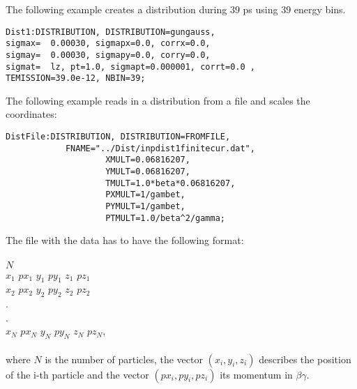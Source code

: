 The following example creates a distribution during $39$ ps using $39$ energy bins.
\begin{verbatim}
Dist1:DISTRIBUTION, DISTRIBUTION=gungauss,
sigmax=  0.00030, sigmapx=0.0, corrx=0.0,
sigmay=  0.00030, sigmapy=0.0, corry=0.0,
sigmat=  lz, pt=1.0, sigmapt=0.000001, corrt=0.0 , 
TEMISSION=39.0e-12, NBIN=39;
\end{verbatim}

The following example reads in a distribution from a file and scales the coordinates:
\begin{verbatim}
DistFile:DISTRIBUTION, DISTRIBUTION=FROMFILE,
			FNAME="../Dist/inpdist1finitecur.dat",
                   	XMULT=0.06816207,
                   	YMULT=0.06816207,
                   	TMULT=1.0*beta*0.06816207,
                   	PXMULT=1/gambet,
                   	PYMULT=1/gambet,
                   	PTMULT=1.0/beta^2/gamma;
\end{verbatim}

The file with the data has to have the following format:\\
\\
$N$\\
$x_1$ $px_1$ $y_1$ $py_1$ $z_1$ $pz_1$\\
$x_2$ $px_2$ $y_2$ $py_2$ $z_2$ $pz_2$\\
.\\
.\\
$x_N$ $px_N$ $y_N$ $py_N$ $z_N$ $pz_N$,\\
\\
where $N$ is the number of particles, the vector $(x_i,y_i,z_i)$ describes the position of the i-th particle and the vector $(px_i, py_i, pz_i)$ its momentum in $\beta \gamma$.
